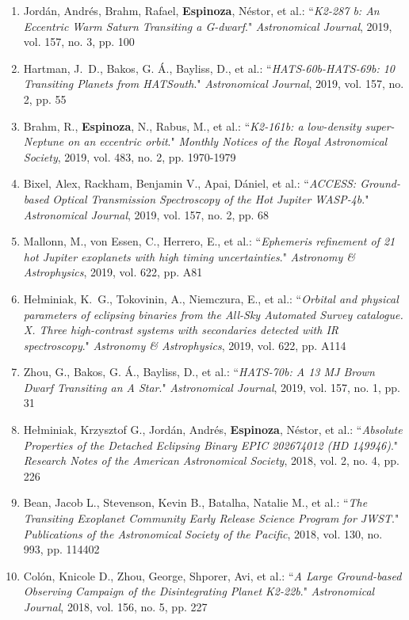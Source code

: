 \documentclass[12pt, a4paper]{article} %
\begin{document}
\begin{flushleft}
\begin{enumerate}
\item Jordán, Andrés, Brahm, Rafael, \textbf{Espinoza}, Néstor, et al.: ``\textit{K2-287 b: An Eccentric Warm Saturn Transiting a G-dwarf}." \textit{Astronomical Journal}, 2019, vol. 157, no. 3, pp. 100
\item Hartman, J.~D., Bakos, G. Á., Bayliss, D., et al.: ``\textit{HATS-60b-HATS-69b: 10 Transiting Planets from HATSouth}." \textit{Astronomical Journal}, 2019, vol. 157, no. 2, pp. 55
\item Brahm, R., \textbf{Espinoza}, N., Rabus, M., et al.: ``\textit{K2-161b: a low-density super-Neptune on an eccentric orbit}." \textit{Monthly Notices of the Royal Astronomical Society}, 2019, vol. 483, no. 2, pp. 1970-1979
\item Bixel, Alex, Rackham, Benjamin V., Apai, Dániel, et al.: ``\textit{ACCESS: Ground-based Optical Transmission Spectroscopy of the Hot Jupiter WASP-4b}." \textit{Astronomical Journal}, 2019, vol. 157, no. 2, pp. 68
\item Mallonn, M., von Essen, C., Herrero, E., et al.: ``\textit{Ephemeris refinement of 21 hot Jupiter exoplanets with high timing uncertainties}." \textit{Astronomy \& Astrophysics}, 2019, vol. 622, pp. A81
\item Hełminiak, K.~G., Tokovinin, A., Niemczura, E., et al.: ``\textit{Orbital and physical parameters of eclipsing binaries from the All-Sky Automated Survey catalogue. X. Three high-contrast systems with secondaries detected with IR spectroscopy}." \textit{Astronomy \& Astrophysics}, 2019, vol. 622, pp. A114
\item Zhou, G., Bakos, G. Á., Bayliss, D., et al.: ``\textit{HATS-70b: A 13 MJ Brown Dwarf Transiting an A Star}." \textit{Astronomical Journal}, 2019, vol. 157, no. 1, pp. 31
\item Hełminiak, Krzysztof G., Jordán, Andrés, \textbf{Espinoza}, Néstor, et al.: ``\textit{Absolute Properties of the Detached Eclipsing Binary EPIC 202674012 (HD 149946)}." \textit{Research Notes of the American Astronomical Society}, 2018, vol. 2, no. 4, pp. 226
\item Bean, Jacob L., Stevenson, Kevin B., Batalha, Natalie M., et al.: ``\textit{The Transiting Exoplanet Community Early Release Science Program for JWST}." \textit{Publications of the Astronomical Society of the Pacific}, 2018, vol. 130, no. 993, pp. 114402
\item Colón, Knicole D., Zhou, George, Shporer, Avi, et al.: ``\textit{A Large Ground-based Observing Campaign of the Disintegrating Planet K2-22b}." \textit{Astronomical Journal}, 2018, vol. 156, no. 5, pp. 227

\end{enumerate}
\end{flushleft}
\end{document}
